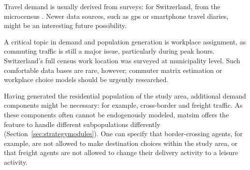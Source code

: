 Travel demand is usually derived from surveys: for Switzerland, from the \gls{microcensus} \citep[][]{BfS-MZ2005_manual_2006}. Newer data sources, such as \gls{gps} or smartphone travel diaries, might be an interesting future possibility.

A critical topic in demand and population generation is workplace assignment, as commuting traffic is still a major issue, particularly during peak hours. Switzerland's full census work location was surveyed at municipality level. Such comfortable data bases are rare, however; commuter matrix estimation or workplace choice models should be urgently researched.

Having generated the residential population of the study area, additional demand components might be necessary: for example, cross-border and freight traffic. As these components often cannot be endogenously modeled, \gls{matsim} offers the feature to handle different subpopulations differently (Section~\ref{sec:strategymodules}). One can specify that border-crossing agents, for example, are not allowed to make destination choices within the study area, or that freight agents are not allowed to change their delivery activity to a leisure activity.

